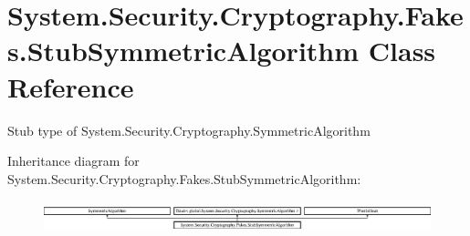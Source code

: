 \hypertarget{class_system_1_1_security_1_1_cryptography_1_1_fakes_1_1_stub_symmetric_algorithm}{\section{System.\-Security.\-Cryptography.\-Fakes.\-Stub\-Symmetric\-Algorithm Class Reference}
\label{class_system_1_1_security_1_1_cryptography_1_1_fakes_1_1_stub_symmetric_algorithm}
}


Stub type of System.\-Security.\-Cryptography.\-Symmetric\-Algorithm 


Inheritance diagram for System.\-Security.\-Cryptography.\-Fakes.\-Stub\-Symmetric\-Algorithm\-:\begin{figure}[H]
\begin{center}
\leavevmode
\includegraphics[height=0.938023cm]{class_system_1_1_security_1_1_cryptography_1_1_fakes_1_1_stub_symmetric_algorithm}
\end{center}
\end{figure}
